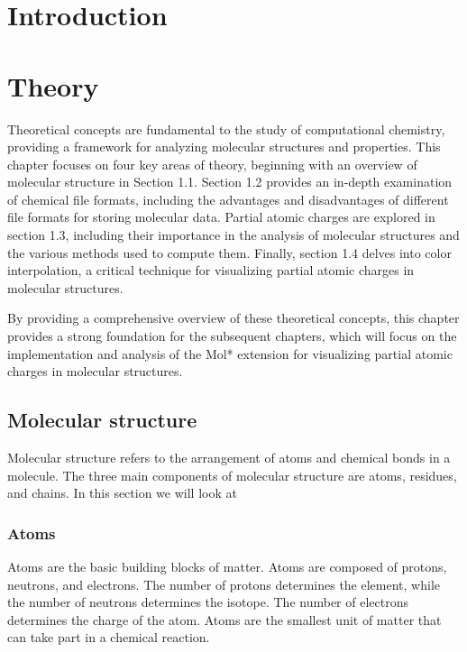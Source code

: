 \documentclass[
  digital,     %
  oneside,     %
  nosansbold,  %
  nocolorbold, %
  lof,         %
  lot,         %
]{fithesis4}
\begin{document}
\chapter*{Introduction}

\chapter{Theory}
\label{chapter:theory}

Theoretical concepts are fundamental to the study of computational chemistry, providing a framework for analyzing molecular structures and properties. This chapter focuses on four key areas of theory, beginning with an overview of molecular structure in Section 1.1. Section 1.2 provides an in-depth examination of chemical file formats, including the advantages and disadvantages of different file formats for storing molecular data. Partial atomic charges are explored in section 1.3, including their importance in the analysis of molecular structures and the various methods used to compute them. Finally, section 1.4 delves into color interpolation, a critical technique for visualizing partial atomic charges in molecular structures.

By providing a comprehensive overview of these theoretical concepts, this chapter provides a strong foundation for the subsequent chapters, which will focus on the implementation and analysis of the Mol* extension for visualizing partial atomic charges in molecular structures.

\section{Molecular structure}
\label{section:molecular_structure}

Molecular structure refers to the arrangement of atoms and chemical bonds in a molecule. The three main components of molecular structure are atoms, residues, and chains.
In this section we will look at

\subsection{Atoms}
\label{subsection:atoms}

Atoms are the basic building blocks of matter. Atoms are composed of protons, neutrons, and electrons. The number of protons determines the element, while the number of neutrons determines the isotope. The number of electrons determines the charge of the atom. Atoms are the smallest unit of matter that can take part in a chemical reaction.
\end{document}
